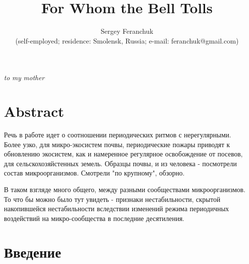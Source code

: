 \documentclass[a4paper]{article}
\begin{document}
\title{For Whom the Bell Tolls}

\author{Sergey Feranchuk \\{\small(self-employed; residence: Smolensk, Russia; e-mail: feranchuk@gmail.com)}}

\maketitle

\begin{flushright}
{\small \textit{to my mother}}
\end{flushright}

\section*{Abstract}

Речь в работе идет о соотношении периодических ритмов с нерегулярными. Более узко, для микро-экосистем почвы, периодические пожары приводят к обновлению экосистем, как и намеренное регулярное освобождение от посевов, для  сельскохозяйстенных земель. Образцы почвы, и из человека - посмотрели состав микроорганизмов. Смотрели "по крупному", обзорно.

В таком взгляде много общего, между разными сообществами микроорганизмов. То что бы можно было тут увидеть - признаки нестабильности, скрытой накопившейся нестабильности вследствии изменений режима периодичных воздействий на микро-сообщества в последние десятиления.


\section{Введение}
\end{document}
